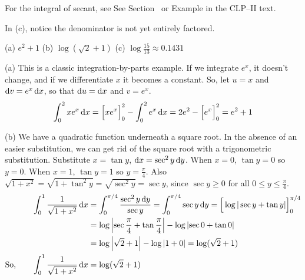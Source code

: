 \begin{hint}
For the integral of secant, see
See Section~ or Example  in the
CLP--II text.

In (c), notice the denominator is not yet entirely factored.
\end{hint}

\begin{answer} (a)
$e^2+1$
\qquad (b)
$\log(\sqrt{2}+1)$
\qquad (c)
$\log\frac{15}{13}\approx 0.1431$
\end{answer}

\begin{solution} (a) This is a classic integration-by-parts example. If we integrate $e^x$, it doesn't change, and if we differentiate $x$ it becomes a constant. So,
let $u=x$ and $\mathrm{d}v=e^x\,\mathrm{d}x$,
so that $\mathrm{d}u=\mathrm{d}x$ and $v=e^x$.
\begin{align*}
\int_0^2 xe^x\,\mathrm{d}x=\Big[xe^x\Big]_0^2-\int_0^2 e^x\,\mathrm{d}x
=2e^2-\Big[e^x\Big]_0^2
=e^2+1
\end{align*}


\noindent (b)  We have a quadratic function underneath a square root. In the absence of an easier substitution, we can get rid of the square root with a trigonometric substitution.
 Substitute $x=\tan y$, $\mathrm{d}x=\sec^2 y\,\mathrm{d}y$. When $x=0$, $\tan y=0$
so $y=0$. When $x=1$, $\tan y=1$ so $y=\frac{\pi}{4}$. Also $\sqrt{1+x^2}
=\sqrt{1+\tan^2y}=\sqrt{\sec^2 y}=\sec y$, since $\sec y\ge 0$ for all
$0\le y\le\frac{\pi}{4}$.
\begin{align*}
\int_0^1\frac{1}{\sqrt{1+x^2}}\,\mathrm{d}x
&=\int_0^{\pi/4} \frac{\sec^2y\,\mathrm{d}y}{\sec y}
=\int_0^{\pi/4} \sec y\,\mathrm{d}y
=\Big[\log|\sec y+\tan y|\Big]_0^{\pi/4}\\
&=\log\left| \sec \frac{\pi}{4}  + \tan\frac{\pi}{4}\right|-\log\left| \sec 0 + \tan 0\right|\\
&=\log\left| \sqrt{2}  + 1\right|-\log\left| 1+  0\right|=\log(\sqrt{2}+1)\\
\text{So,}\qquad\int_0^1\frac{1}{\sqrt{1+x^2}}\,\mathrm{d}x&=\log(\sqrt{2}+1)
\end{align*}



\end{solution}
